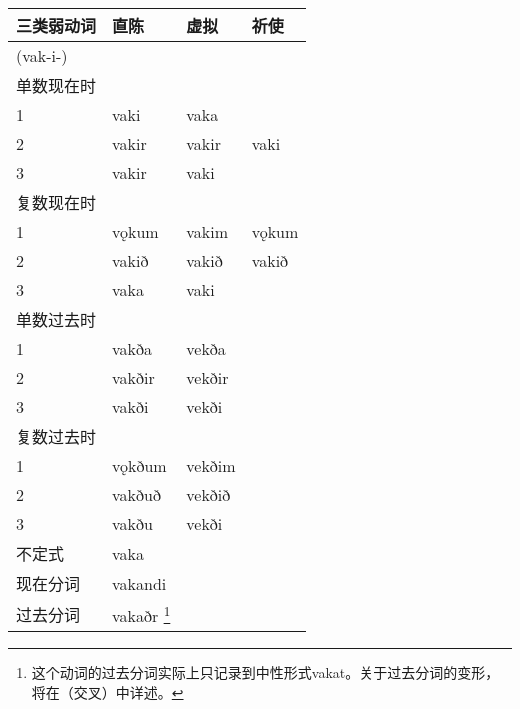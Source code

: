 \begin{longtable}{llll}
    \toprule
    三类弱动词    & 直陈                                                               & 虚拟     & 祈使    \\
    \midrule
    \endhead
    \bottomrule
    \endfoot
    (vak-i-) &                                                                  &        &       \\
    单数现在时    &                                                                  &        &       \\
    1        & vaki                                                             & vaka   &       \\
    2        & vakir                                                            & vakir  & vaki  \\
    3        & vakir                                                            & vaki   &       \\
    复数现在时    &                                                                  &        &       \\
    1        & vǫkum                                                            & vakim  & vǫkum \\
    2        & vakið                                                            & vakið  & vakið \\
    3        & vaka                                                             & vaki   &       \\
    单数过去时    &                                                                  &        &       \\
    1        & vakða                                                            & vekða  &       \\
    2        & vakðir                                                           & vekðir &       \\
    3        & vakði                                                            & vekði  &       \\
    复数过去时    &                                                                  &        &       \\
    1        & vǫkðum                                                           & vekðim &       \\
    2        & vakðuð                                                           & vekðið &       \\
    3        & vakðu                                                            & vekði  &       \\
    不定式      & vaka                                                             &        &       \\
    现在分词     & vakandi                                                          &        &       \\
    过去分词     & vakaðr \footnote{这个动词的过去分词实际上只记录到中性形式vakat。关于过去分词的变形，将在（交叉）中详述。}
             &                                                                  &                \\
\end{longtable}

